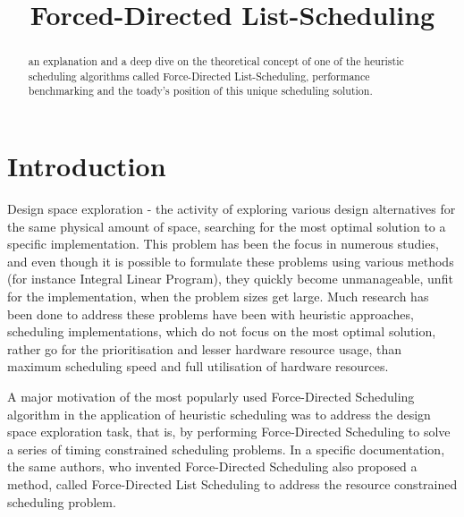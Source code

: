 \documentclass[conference]{IEEEtran}
\begin{document}
\title{Forced-Directed List-Scheduling}

\author{
}

\maketitle

\begin{abstract}
an explanation and a deep dive on the theoretical concept of one of the heuristic scheduling algorithms called Force-Directed List-Scheduling, performance benchmarking and the toady's position of this unique scheduling solution. 
\end{abstract}



\thispagestyle{firstpagefooter}

\section{Introduction}

Design space exploration - the activity of exploring various design alternatives for the same physical amount of space, searching for the most optimal solution to a specific implementation. This problem has been the focus in numerous studies, and even though it is possible to formulate these problems using various methods (for instance Integral Linear Program), they quickly become unmanageable, unfit for the implementation, when the problem sizes get large. Much research has been done to address these problems have been with heuristic approaches, scheduling implementations, which do not focus on the most optimal solution, rather go for the prioritisation and lesser hardware resource usage, than maximum scheduling speed and full utilisation of hardware resources. 

A major motivation of the most popularly used Force-Directed Scheduling algorithm in the application of heuristic scheduling was to address the design space exploration task, that is, by performing Force-Directed Scheduling to solve a series of timing constrained scheduling problems. In a specific documentation\cite{b4}, the same authors, who invented Force-Directed Scheduling also proposed a method, called Force-Directed List Scheduling to address the resource constrained scheduling problem.
\end{document}
